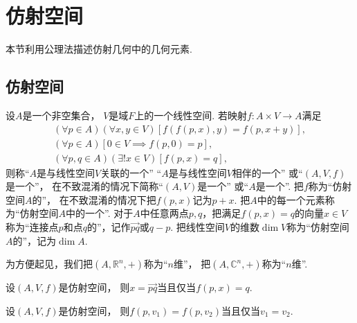 \section{仿射空间}
本节利用公理法描述仿射几何中的几何元素.

\subsection{仿射空间}
\begin{definition}
设\(A\)是一个非空集合，
\(V\)是域\(F\)上的一个线性空间.
若映射\(f\colon A \times V \to A\)满足\begin{gather*}
	(\forall p \in A)
	(\forall x,y \in V)
	[
		f(f(p,x),y)
		= f(p,x+y)
	], \\
	(\forall p \in A)
	[
		0 \in V
		\implies
		f(p,0) = p
	], \\
	(\forall p,q \in A)
	(\exists! x \in V)
	[
		f(p,x) = q
	],
\end{gather*}
则称“\(A\)是与线性空间\(V\)关联的一个”
“\(A\)是与线性空间\(V\)相伴的一个”
或“\((A,V,f)\)是一个”，
在不致混淆的情况下简称“\((A,V)\)是一个”
或“\(A\)是一个”.
把\(f\)称为“仿射空间\(A\)的”，
在不致混淆的情况下把\(f(p,x)\)记为\(p + x\).
把\(A\)中的每一个元素称为“仿射空间\(A\)中的一个”.
对于\(A\)中任意两点\(p,q\)，把满足\(f(p,x) = q\)的向量\(x \in V\)
称为“连接点\(p\)和点\(q\)的”，记作\(\vec{pq}\)或\(q - p\).
把线性空间\(V\)的维数\(\dim V\)称为“仿射空间\(A\)的”，记为\(\dim A\).
\end{definition}

为方便起见，我们把\((A,\mathbb{R}^n,+)\)称为“\(n\)维”，
把\((A,\mathbb{C}^n,+)\)称为“\(n\)维”.

\begin{property}%
设\((A,V,f)\)是仿射空间，
则\(x = \vec{pq}\)当且仅当\(f(p,x) = q\).
\end{property}

\begin{property}%
设\((A,V,f)\)是仿射空间，
则\(f(p,v_1) = f(p,v_2)\)当且仅当\(v_1 = v_2\).
\end{property}


